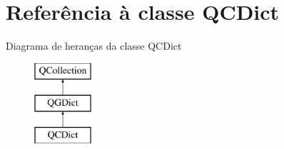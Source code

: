 \hypertarget{class_q_c_dict}{\section{Referência à classe Q\-C\-Dict}
\label{class_q_c_dict}
}
Diagrama de heranças da classe Q\-C\-Dict\begin{figure}[H]
\begin{center}
\leavevmode
\includegraphics[height=3.000000cm]{class_q_c_dict}
\end{center}
\end{figure}
